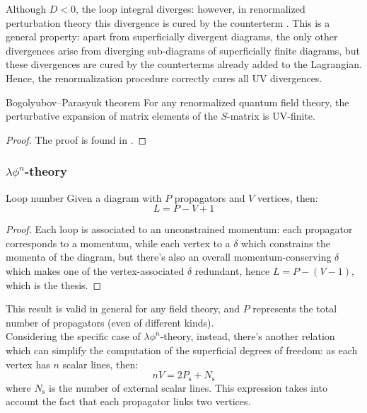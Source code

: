 Although $ D < 0 $, the loop integral diverges: however, in renormalized perturbation theory this divergence is cured by the counterterm . This is a general property: apart from superficially divergent diagrams, the only other divergences arise from diverging sub-diagrams of superficially finite diagrams, but these divergences are cured by the counterterms already added to the Lagrangian. Hence, the renormalization procedure correctly cures all UV divergences.

\begin{theorem}{Bogolyubov--Parasyuk theorem}{}
  For any renormalized quantum field theory, the perturbative expansion of matrix elements of the $ S $-matrix is UV-finite.
\end{theorem}

\begin{proofbox}
  \begin{proof}
    The proof is found in \cite{bog-par, azp}.
  \end{proof}
\end{proofbox}

\subsubsection{\texorpdfstring{$ \lambda \phi^n $}{λφn}-theory}

\begin{lemma}{Loop number}{}
  Given a diagram with $ P $ propagators and $ V $ vertices, then:
  \begin{equation}
    L = P - V + 1
    \label{eq:loop-num}
  \end{equation}
\end{lemma}

\begin{proofbox}
  \begin{proof}
    Each loop is associated to an unconstrained momentum: each propagator corresponds to a momentum, while each vertex to a $ \delta $ which constrains the momenta of the diagram, but there's also an overall momentum-conserving $ \delta $ which makes one of the vertex-associated $ \delta $ redundant, hence $ L = P - (V - 1) $, which is the thesis.
  \end{proof}
\end{proofbox}

This result is valid in general for any field theory, and $ P $ represents the total number of propagators (even of different kinds). \\
Considering the specific case of $ \lambda \phi^n $-theory, instead, there's another relation which can simplify the computation of the superficial degrees of freedom: as each vertex has $ n $ scalar lines, then:
\begin{equation}
  n V = 2 P_\text{s} + N_\text{s}
  \label{eq:fn-v}
\end{equation}
where $ N_\text{s} $ is the number of external scalar lines. This expression takes into account the fact that each propagator links two vertices.

